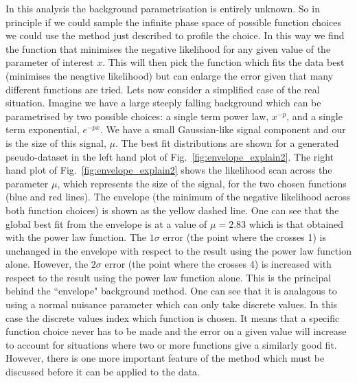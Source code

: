 In this analysis the background parametrisation is entirely unknown. So in principle if we could sample the infinite phase space of possible function choices we could use the method just described to profile the choice. In this way we find the function that minimises the negative likelihood for any given value of the parameter of interest $x$. This will then pick the function which fits the data best (minimises the neagtive likelihood) but can enlarge the error given that many different functions are tried.
Lets now consider a simplified case of the real situation. Imagine we have a large steeply falling background which can be parametrised by two possible choices: a single term power law, $x^{-p}$, and a single term exponential, $e^{-px}$. We have a small Gaussian-like signal component and our \POI is the size of this signal, $\mu$. The best fit distributions are shown for a generated pseudo-dataset in the left hand plot of Fig.~\ref{fig:envelope_explain2}. The right hand plot of Fig.~\ref{fig:envelope_explain2} shows the likelihood scan across the parameter $\mu$, which represents the size of the signal, for the two chosen functions (blue and red lines). The envelope (the minimum of the negative likelihood across both function choices) is shown as the yellow dashed line. One can see that the global best fit from the envelope is at a value of $\mu=2.83$ which is that obtained with the power law function. The $1\sigma$ error (the point where the \NLL crosses 1) is unchanged in the envelope with respect to the result using the power law function alone. However, the $2\sigma$ error (the point where the \NLL crosses 4) is increased with respect to the result using the power law function alone. This is the principal behind the ``envelope" background method. One can see that it is analagous to using a normal nuisance parameter which can only take discrete values. In this case the discrete values index which function is chosen. It means that a specific function choice never has to be made and the error on a given value will increase to account for situations where two or more functions give a similarly good fit. However, there is one more important feature of the method which must be discussed before it can be applied to the data.


